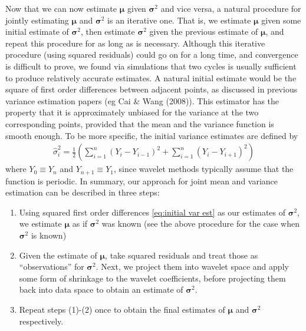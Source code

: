 \documentclass[12pt]{article}
\newcommand{\s}{\sigma}
\begin{document}
Now that we can now estimate $\bm{\mu}$ given $\bm{\s}^2$ and vice versa, a natural procedure for jointly estimating $\bm{\mu}$ and $\bm{\s}^2$ is an iterative one. That is, we estimate $\bm{\mu}$ given some initial estimate of $\bm{\s}^2$, then estimate $\bm{\s}^2$ given the previous estimate of $\bm{\mu}$, and repeat this procedure for as long as is necessary. Although this iterative procedure (using squared residuals) could go on for a long time, and convergence is difficult to prove, we found via simulations that two cycles is usually sufficient to produce relatively accurate estimates. A natural initial estimate would be the square of first order differences between adjacent points, as discussed in previous variance estimation papers (eg Cai \& Wang (2008)). This estimator has the property that it is approximately unbiased for the variance at the two corresponding points, provided that the mean and the variance function is smooth enough. To be more specific, the initial variance estimates are defined by
\begin{eqnarray}\label{eq:initial var est}
\hat{\s}_i^2=\frac{1}{2}\left(\sum_{i=1}^n(Y_i-Y_{i-1})^2+\sum_{i=1}^n(Y_i-Y_{i+1})^2\right)
\end{eqnarray}
where $Y_0\equiv Y_n$ and $Y_{n+1}\equiv Y_1$, since wavelet methods typically assume that the function is periodic. In summary, our approach for joint mean and variance estimation can be described in three steps:
\begin{enumerate}
\item Using squared first order differences \eqref{eq:initial var est} as our estimates of $\bm{\s}^2$, we estimate $\bm{\mu}$ as if $\bm{\s}^2$ was known (see the above procedure for the case when $\bm{\s}^2$ is known)
\item Given the estimate of $\bm{\mu}$, take squared residuals and treat those as ``observations'' for $\bm{\s}^2$. Next, we project them into wavelet space and apply some form of shrinkage to the wavelet coefficients, before projecting them back into data space to obtain an estimate of $\bm{\s}^2$.
\item Repeat steps (1)-(2) once to obtain the final estimates of $\bm{\mu}$ and $\bm{\s}^2$ respectively.
\end{enumerate}
\end{document}
